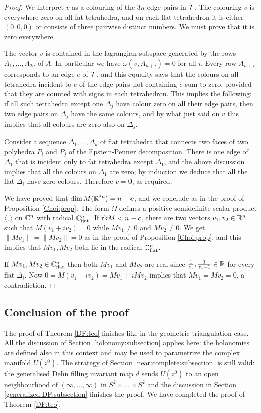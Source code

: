 \begin{proof}
We interpret $v$ as a colouring of the $3n$ edge pairs in $\mathcal{T}$. The colouring $v$ is everywhere zero on all fat tetrahedra, and on each flat tetrahedron it is either $(0,0,0)$ or consists of three pairwise distinct numbers. We must prove that it is zero everywhere.

The vector $v$ is contained in the lagrangian subspace generated by the rows $A_1,\ldots, A_{2n}$ of $A$. In particular we have $\omega(v,A_{n+i})=0$ for all $i$. Every row $A_{n+i}$ corresponds to an edge $e$ of $\mathcal{T}$, and this equality says that the colours on all tetrahedra incident to $e$ of the edge pairs not containing $e$ sum to zero, provided that they are counted with signs in each tetrahedron. This implies the following: if all such tetrahedra except one $\Delta_j$ have colour zero on all their edge pairs, then two edge pairs on $\Delta_j$ have the same colours, and by what just said on $v$ this implies that all colours are zero also on $\Delta_j$. 

Consider a sequence $\Delta_1, \ldots, \Delta_k$ of flat tetrahedra that connects two faces of two polyhedra $P_i$ and $P_j$ of the Epstein-Penner decomposition. There is one edge of $\Delta_1$ that is incident only to fat tetrahedra except $\Delta_1$, and the above discussion implies that all the colours on $\Delta_1$ are zero; by induction we deduce that all the flat $\Delta_i$ have zero colours. Therefore $v=0$, as required.

We have proved that $\dim M(\mathbb{R}^{2n}) = n-c$, and we conclude as in the proof of Proposition \ref{Choi:prop}. The form $\Omega$ defines a positive semidefinite scalar product $\langle, \rangle$ on $\mathbb{C}^n$ with radical $\mathbb{C}^n_{\rm flat}$. If ${\rm rk} M < n-c$, there are two vectors $v_1,v_2\in \mathbb{R}^n$ such that $M(v_1+iv_2) = 0$ while $Mv_1 \neq 0$ and $Mv_2 \neq 0$. We get $\|Mv_1\| = \|Mv_2\| = 0$ as in the proof of Proposition \ref{Choi:prop}, and this implies that $Mv_1, Mv_2$ both lie in the radical $\mathbb{C}^n_{\rm flat}$.

If $Mv_1, Mv_2 \in \mathbb{C}^n_{\rm flat}$ then both $Mv_1$ and $Mv_2$ are real since $\frac 1{z_i}, \frac{1}{z_i-1} \in \mathbb{R}$ for every flat $\Delta_i$. Now $0 = M(v_1+iv_2) = Mv_1 + iMv_2$ implies that $Mv_1 = Mv_2 = 0$, a contradiction.
\end{proof}

\subsection{Conclusion of the proof}
The proof of Theorem \ref{DF:teo} finishes like in the geometric triangulation case.
All the discussion of Section \ref{holonomy:subsection} applies here: the holonomies are defined also in this context and may be used to parametrize the complex manifold $U(z^0)$. The strategy of Section \ref{near:complete:subsection} is still valid: the generalised Dehn filling invariant map $d$ sends $U(z^0)$ to an open neighbourhood of $(\infty,\ldots, \infty)$ in $S^2\times \ldots \times S^2$ and the discussion in Section \ref{generalized:DF:subsection} finishes the proof.
We have completed the proof of Theorem \ref{DF:teo}.

